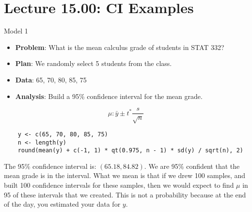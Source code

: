 \section{Lecture 15.00: CI Examples}
\begin{Example}{Model 1}{}
    \begin{itemize}
        \item \textbf{Problem}: What is the mean calculus grade of students in STAT 332?
        \item \textbf{Plan}: We randomly select 5 students from the class.
        \item \textbf{Data}: 65, 70, 80, 85, 75
        \item \textbf{Analysis}: Build a 95\% confidence interval for the mean grade.
    \end{itemize}
    \[ \mu:\bar{y}\pm t^* \frac{s}{\sqrt{n}} \]
    \begin{verbatim}
    y <- c(65, 70, 80, 85, 75)
    n <- length(y)
    round(mean(y) + c(-1, 1) * qt(0.975, n - 1) * sd(y) / sqrt(n), 2)
    \end{verbatim}
    The 95\% confidence interval is: $(65.18, 84.82)$. We are 95\% confident
    that the mean grade is in the interval. What we mean is that
    if we drew 100 samples, and built 100 confidence intervals for these
    samples, then we would expect to find $\mu$ in 95 of these intervals
    that we created. This is not a probability because at the end of the day,
    you estimated your data for $ y $.
\end{Example}
